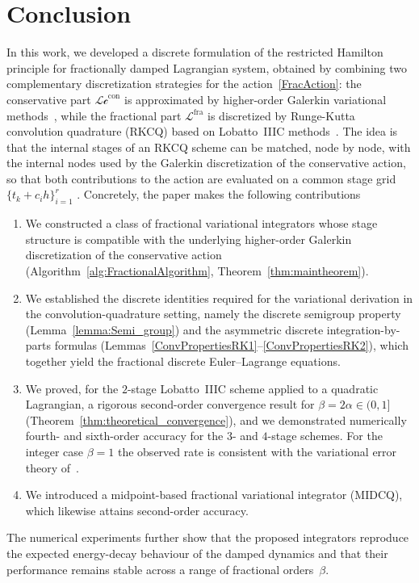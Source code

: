\documentclass[a4paper,10pt,reqno]{amsart}
\theoremstyle{definition}
\newcommand{\Lc}{\mathcal{Lc}^{\text{con}}}
\newcommand{\Lf}{\mathcal{L}^{\text{fra}}}
\begin{document}
\section{Conclusion}\label{conclusion}
In this work, we developed a discrete formulation of the restricted Hamilton principle for fractionally damped Lagrangian system, obtained by combining two complementary discretization strategies for the action~\eqref{FracAction}: the conservative part $\Lc$ is approximated by higher-order Galerkin variational methods~\cite{HaLe13,MaWe,SinaSaake}, while the fractional part $\Lf$ is discretized by  Runge-Kutta convolution quadrature (RKCQ) based on Lobatto~IIIC methods~\cite{LuOs,BaLu,BaLo}. The idea is that the internal stages of an RKCQ scheme can be matched, node by node, with the internal nodes used by the Galerkin discretization of the conservative action, so that both contributions to the action are evaluated on a common stage grid $\{t_k + c_i h\}_{i=1}^r$ . Concretely, the paper makes the following contributions
\begin{enumerate}[leftmargin=2.5em]
  \item We constructed a class of fractional variational integrators whose stage
        structure is compatible with the underlying higher-order Galerkin
        discretization of the conservative action (Algorithm~\ref{alg:FractionalAlgorithm}, Theorem~\ref{thm:maintheorem}).
  \item We established the discrete identities required for the variational
        derivation in the convolution-quadrature setting, namely the discrete
        semigroup property (Lemma~\ref{lemma:Semi_group}) and the asymmetric discrete
        integration-by-parts formulas (Lemmas~\ref{ConvPropertiesRK1}--\ref{ConvPropertiesRK2}), which together yield the fractional discrete Euler--Lagrange equations.
  \item We proved, for the $2$-stage Lobatto~IIIC scheme applied to a quadratic
        Lagrangian, a rigorous second-order convergence result for
        $\beta=2\alpha\in(0,1]$ (Theorem~\ref{thm:theoretical_convergence}), and we demonstrated numerically
        fourth- and sixth-order accuracy for the $3$- and $4$-stage schemes. For the integer case $\beta=1$ the observed rate is consistent
        with the variational error theory of~\cite{SinaVerm}.
  \item We introduced a midpoint-based fractional variational integrator (MIDCQ),
        which likewise attains second-order accuracy.
\end{enumerate}
The numerical experiments further show that the proposed integrators reproduce the
expected energy-decay behaviour of the damped dynamics and that their performance
remains stable across a range of fractional orders~$\beta$.
\end{document}
